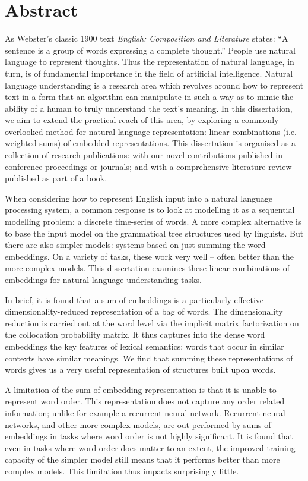 \documentclass{book}
\begin{document}
\chapter*{Abstract}
As Webster's classic 1900 text \textit{English: Composition and Literature} states:
``A sentence is a group of words expressing a complete thought.''
People use natural language to represent thoughts.
Thus the representation of natural language, in turn, is of fundamental importance in the field of artificial intelligence.
Natural language understanding is a research area which  revolves around how to represent text in a form that an algorithm can manipulate in such a way as to mimic the ability of a human to truly understand the text's meaning.
In this dissertation, we aim to extend the practical reach of this area,
by exploring a commonly overlooked method for natural language representation: linear combinations (i.e. weighted sums) of embedded representations.
This dissertation is organised as a collection of research publications:
 with our novel contributions published in conference proceedings or journals;
 and with a comprehensive literature review published as part of a book.

When considering how to represent English input into a natural language processing system,
a common response is to look at modelling it as a sequential modelling problem: a discrete time-series of words.
A more complex alternative is to base the input model on the grammatical tree structures used by linguists.
But there are also simpler models: systems based on just summing the word embeddings.
On a variety of tasks, these work very well -- often better than the more complex models.
This dissertation examines these linear combinations of embeddings for natural language understanding tasks.

In brief, it is found that a sum of embeddings is a particularly effective dimensionality-reduced representation of a bag of words.
The dimensionality reduction is carried out at the word level via the implicit matrix factorization 
on the collocation probability matrix.
It thus captures into the dense word embeddings the key features of lexical semantics:
words that occur in similar contexts have similar meanings.
We find that summing these representations of words gives us a very useful representation of structures built upon words.

A limitation of the sum of embedding representation is that it is unable to represent word order.
This representation does not capture any order related information; unlike for example a recurrent neural network.
Recurrent neural networks, and other more complex models, are out performed by sums of embeddings in tasks where word order is not highly significant.
It is found that even in tasks where word order does matter to an extent, the improved training capacity of the simpler model still means that it performs better than more complex models.
This limitation thus impacts surprisingly little.
\end{document}
